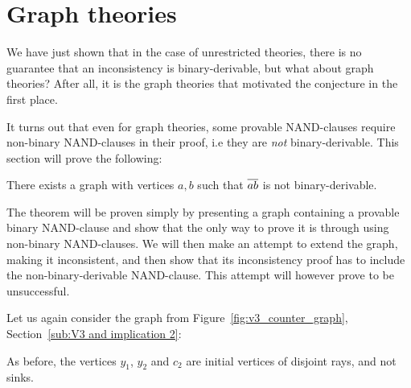 \section{Graph theories}
\label{sec:Graph theories}
We have just shown that in the case of unrestricted theories, there is no guarantee that an inconsistency is binary-derivable, but what about graph theories?
After all, it is the graph theories that motivated the conjecture in the first place.

It turns out that even for graph theories, some provable NAND-clauses require non-binary NAND-clauses in their proof, i.e they are \textit{not} binary-derivable.
This section will prove the following:
\begin{theorem}
  There exists a graph with vertices $a,b$ such that $\ol{ab}$ is not binary-derivable.
  \label{thm:non_binary_derivable}
\end{theorem}
The theorem will be proven simply by presenting a graph containing a provable binary NAND-clause and show that the only way to prove it is through using non-binary NAND-clauses.
We will then make an attempt to extend the graph, making it inconsistent, and then show that its inconsistency proof has to include the non-binary-derivable NAND-clause.
This attempt will however prove to be unsuccessful.

Let us again consider the graph from Figure~\ref{fig:v3_counter_graph}, Section~\ref{sub:V3 and implication 2}:\par
\begin{figure}[!h]
  \centering
  \caption{}
  \label{fig:open_door}
\end{figure}
As before, the vertices $y_1$, $y_2$ and $c_2$ are initial vertices of disjoint rays, and not sinks.

